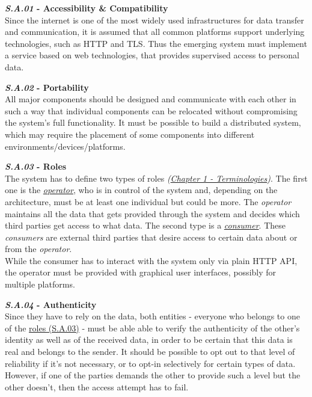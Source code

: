 \documentclass[12pt,english,a4paper,titlepage,cleardoublepage=empty,dottedtoc]{report}
\begin{document}
\textbf{\emph{\protect\hypertarget{sa01}{}{S.A.01}} - Accessibility \&
Compatibility}\\
Since the internet is one of the most widely used infrastructures for
data transfer and communication, it is assumed that all common platforms
support underlying technologies, such as HTTP and TLS. Thus the emerging
system must implement a service based on web technologies, that provides
supervised access to personal data.

\textbf{\emph{\protect\hypertarget{sa02}{}{S.A.02}} - Portability}\\
All major components should be designed and communicate with each other
in such a way that individual components can be relocated without
compromising the system's full functionality. It must be possible to
build a distributed system, which may require the placement of some
components into different environments/devices/platforms.

\textbf{\emph{\protect\hypertarget{sa03}{}{S.A.03}} - Roles}\\
The system has to define two types of roles
\emph{(\protect\hyperlink{terminologies}{Chapter 1 - Terminologies})}.
The first one is the
\emph{\protect\hyperlink{terminologies--operator}{operator}}, who is in
control of the system and, depending on the architecture, must be at
least one individual but could be more. The \emph{operator} maintains
all the data that gets provided through the system and decides which
third parties get access to what data. The second type is a
\emph{\protect\hyperlink{terminologies--consumer}{consumer}}. These
\emph{consumers} are external third parties that desire access to
certain data about or from the \emph{operator}.\\
While the consumer has to interact with the system only via plain HTTP
API, the operator must be provided with graphical user interfaces,
possibly for multiple platforms.

\textbf{\emph{\protect\hypertarget{sa04}{}{S.A.04}} - Authenticity}\\
Since they have to rely on the data, both entities - everyone who
belongs to one of the \protect\hyperlink{sa03}{roles (S.A.03)} - must be
able able to verify the authenticity of the other's identity as well as
of the received data, in order to be certain that this data is real and
belongs to the sender. It should be possible to opt out to that level of
reliability if it's not necessary, or to opt-in selectively for certain
types of data. However, if one of the parties demands the other to
provide such a level but the other doesn't, then the access attempt has
to fail.
\end{document}
